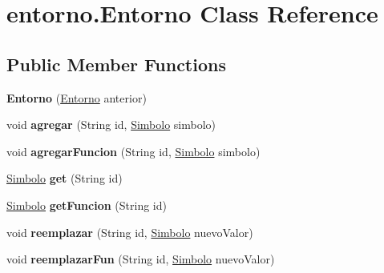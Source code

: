 \hypertarget{classentorno_1_1_entorno}{}\section{entorno.\+Entorno Class Reference}
\label{classentorno_1_1_entorno}
\subsection*{Public Member Functions}
\begin{DoxyCompactItemize}
\item 
\mbox{\label{classentorno_1_1_entorno_a7a0843748c778ddb94aa815d28c41536}} 
{\bfseries Entorno} (\mbox{\hyperlink{classentorno_1_1_entorno}{Entorno}} anterior)
\item 
\mbox{\label{classentorno_1_1_entorno_a8b196372a177862e71bcdc9c0193b391}} 
void {\bfseries agregar} (String id, \mbox{\hyperlink{classentorno_1_1_simbolo}{Simbolo}} simbolo)
\item 
\mbox{\label{classentorno_1_1_entorno_a49e07a304315b92414630ecaca7e56ea}} 
void {\bfseries agregar\+Funcion} (String id, \mbox{\hyperlink{classentorno_1_1_simbolo}{Simbolo}} simbolo)
\item 
\mbox{\label{classentorno_1_1_entorno_ab7a2724644ae90bbc9e620049c829b9e}} 
\mbox{\hyperlink{classentorno_1_1_simbolo}{Simbolo}} {\bfseries get} (String id)
\item 
\mbox{\label{classentorno_1_1_entorno_a08eb0a0347adda9f40bcb776c701e361}} 
\mbox{\hyperlink{classentorno_1_1_simbolo}{Simbolo}} {\bfseries get\+Funcion} (String id)
\item 
\mbox{\label{classentorno_1_1_entorno_a4ba0e65ae77a0bbb439dcf064d6be983}} 
void {\bfseries reemplazar} (String id, \mbox{\hyperlink{classentorno_1_1_simbolo}{Simbolo}} nuevo\+Valor)
\item 
\mbox{\label{classentorno_1_1_entorno_ac03c40600e1cab9d8d946fd6f1cfad60}} 
void {\bfseries reemplazar\+Fun} (String id, \mbox{\hyperlink{classentorno_1_1_simbolo}{Simbolo}} nuevo\+Valor)

\end{DoxyCompactItemize}
